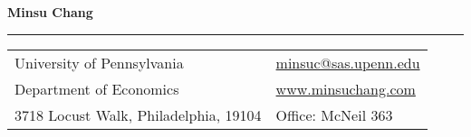 \documentclass[letterpaper,11pt,oneside]{article}
\newcommand*{\Skype}{\href{skype:minsu.chang1111?add}{minsu.chang1111}}
\newcommand{\Absender}[1][\normalsize]{\Skype}
\begin{document}

\noindent  \LARGE{\textbf{Minsu Chang}}  \\
\vspace{-1ex}
\hrule
\normalsize


\begin{center}
\begin{tabular}{l l}
 University of Pennsylvania    & \hspace{1in} \href{mailto:minsuc@sas.upenn.edu}{minsuc@sas.upenn.edu} \\
 Department of Economics    & \hspace{1in}  \href{www.minsuchang.com}{www.minsuchang.com}   \\
 3718 Locust Walk, Philadelphia, 19104              & \hspace{1in} Office: McNeil 363 \\%
\end{tabular}
\end{center}

\vspace{1em}

\end{document}
